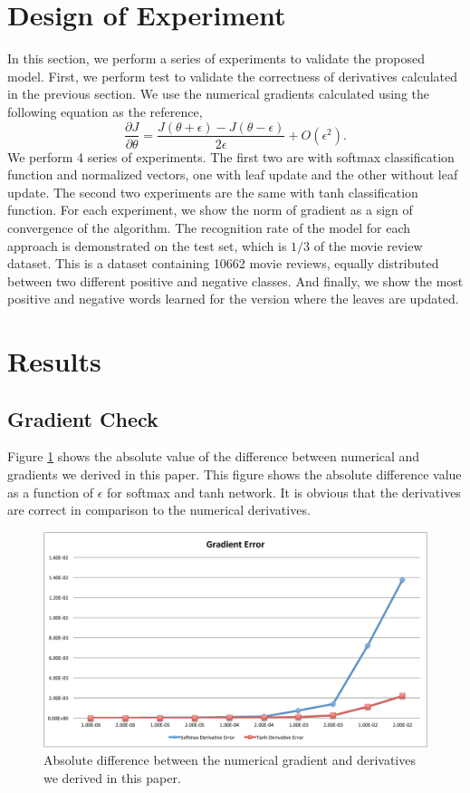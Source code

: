 \documentclass[twoside,12pt]{article}
\begin{document}
\section{Design of Experiment}
In this section, we perform a series of experiments to validate the proposed model. First, we perform test to validate the correctness of derivatives calculated in the previous section. We use the numerical gradients calculated using the following equation as the reference,
\begin{equation}
\frac{\partial J}{\partial \theta}=\frac{J(\theta+\epsilon)-J(\theta-\epsilon)}{2\epsilon}+O(\epsilon^2).
\end{equation}
We perform 4 series of experiments. The first two are with softmax classification function and normalized vectors, one with leaf update and the other without leaf update. The second two experiments are the same with tanh classification function. For each experiment, we show the norm of gradient as a sign of convergence of the algorithm. The recognition rate of the model for each approach is demonstrated on the test set, which is $1/3$ of the movie review dataset. This is a dataset containing 10662 movie reviews, equally distributed between two different positive and negative classes. And finally, we show the most positive and negative words learned for the version where the leaves are updated.

\section{Results}
\subsection{Gradient Check}
Figure \ref{figGradCheck} shows the absolute value of the difference between numerical and gradients we derived in this paper. This figure shows the absolute difference value as a function of $\epsilon$ for softmax and tanh network. It is obvious that the derivatives are correct in comparison to the numerical derivatives.

\begin{figure}
\centering
\includegraphics[width=1.\textwidth]{gradError.pdf}
\caption{Absolute difference between the numerical gradient and derivatives we derived in this paper.}
\label{figGradCheck}
\end{figure}
\end{document}
